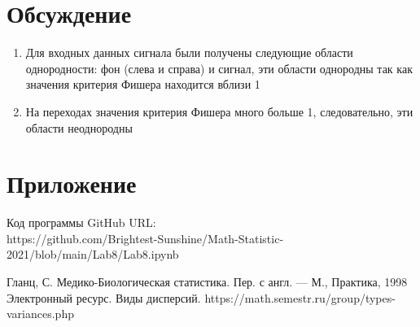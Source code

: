 \documentclass{article}
\begin{document}
\section{Обсуждение}
\begin{enumerate}
    \item Для входных данных сигнала были получены следующие области
однородности: фон (слева и справа) и сигнал, эти области
однородны так как значения критерия Фишера находится вблизи 1
\item На переходах значения критерия Фишера много больше 1,
следовательно, эти области неоднородны
\end{enumerate}

\section{Приложение}
\noindent Код программы GitHub URL:\\
\newline https://github.com/Brightest-Sunshine/Math-Statistic-2021/blob/main/Lab8/Lab8.ipynb

\begin{thebibliography}{9}
 Гланц, С. Медико-Биологическая статистика. Пер. с англ. — М.,
Практика, 1998
 Электронный ресурс. Виды дисперсий.
https://math.semestr.ru/group/types-variances.php
\end{thebibliography}
\end{document}
